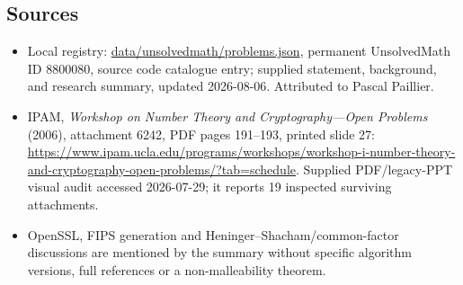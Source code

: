 \documentclass[11pt]{article}
\begin{document}
\subsection{Sources}
\begin{itemize}
\item Local registry: \url{data/unsolvedmath/problems.json}, permanent UnsolvedMath ID \(8800080\), source code catalogue entry; supplied statement, background, and research summary, updated 2026-08-06. Attributed to Pascal Paillier.
\item IPAM, \emph{Workshop on Number Theory and Cryptography---Open Problems} (2006), attachment 6242, PDF pages 191--193, printed slide 27: \url{https://www.ipam.ucla.edu/programs/workshops/workshop-i-number-theory-and-cryptography-open-problems/?tab=schedule}. Supplied PDF/legacy-PPT visual audit accessed 2026-07-29; it reports 19 inspected surviving attachments.
\item OpenSSL, FIPS generation and Heninger--Shacham/common-factor discussions are mentioned by the summary without specific algorithm versions, full references or a non-malleability theorem.
\end{itemize}
\end{document}
